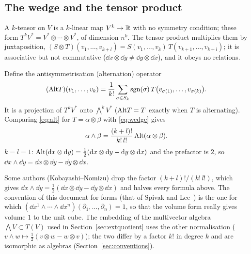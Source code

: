 \subsection{The wedge and the tensor product}\label{sec:wedgetensor}

A $k$-tensor on $V$ is a $k$-linear map $V^k\to\mathbb{R}$ with no symmetry condition; these form $T^kV^*=V^*\otimes\cdots\otimes V^*$, of dimension
$n^k$. The tensor product multiplies them by juxtaposition, $(S\otimes T)(v_1,\dots,v_{k+l})=S(v_1,\dots,v_k)\,T(v_{k+1},\dots,v_{k+l})$;
it is associative but not commutative ($\dd x\otimes\dd y\neq\dd y\otimes\dd x$), and it obeys no relations.

Define the antisymmetrisation (alternation) operator
\begin{equation}\label{eq:alt}
(\mathrm{Alt} T)(v_1,\dots,v_k)=\frac1{k!}\sum_{\sigma\in S_k}\mathrm{sgn}(\sigma)\,T\bigl(v_{\sigma(1)},\dots,v_{\sigma(k)}\bigr).
\end{equation}
It is a projection of $T^kV^*$ onto $\bigwedge^kV^*$ ($\mathrm{Alt} T=T$ exactly when $T$ is alternating). Comparing \eqref{eq:alt} for $T=\alpha\otimes\beta$
with \eqref{eq:wedge} gives
\begin{equation}\label{eq:altwedge}
\alpha\wedge\beta=\frac{(k+l)!}{k!\,l!}\,\mathrm{Alt}(\alpha\otimes\beta).
\end{equation}
\numcheck $k=l=1$: $\mathrm{Alt}(\mathrm{d} x\otimes\mathrm{d} y)=\tfrac12(\mathrm{d} x\otimes\mathrm{d} y-\mathrm{d} y\otimes\mathrm{d} x)$ and the prefactor is $2$, so
$\dd x\wedge\dd y=\dd x\otimes\dd y-\dd y\otimes\dd x$.

\begin{pitfall}[a warning on conventions]
Some authors (\eg Kobayashi--Nomizu) drop the factor $(k+l)!/(k!\,l!)$, which gives $\dd x\wedge\dd y=\tfrac12(\dd x\otimes\dd y-\dd y\otimes\dd x)$ and
halves every formula above. The convention of this document for forms (that of Spivak and Lee~\cite{Spivak,Lee}) is the one for which
$(\dd x^1\wedge\cdots\wedge\dd x^n)(\partial_1,\dots,\partial_n)=1$, so that the volume form really gives volume $1$ to the unit cube.
The embedding of the multivector algebra $\bigwedge V\subset T(V)$ used in Section~\ref{sec:extquotient} uses the other normalisation
($v\wedge w\mapsto\frac12(v\otimes w-w\otimes v)$); the two differ by a factor $k!$ in degree $k$ and are isomorphic as algebras
(Section~\ref{sec:conventions}).
\end{pitfall}

